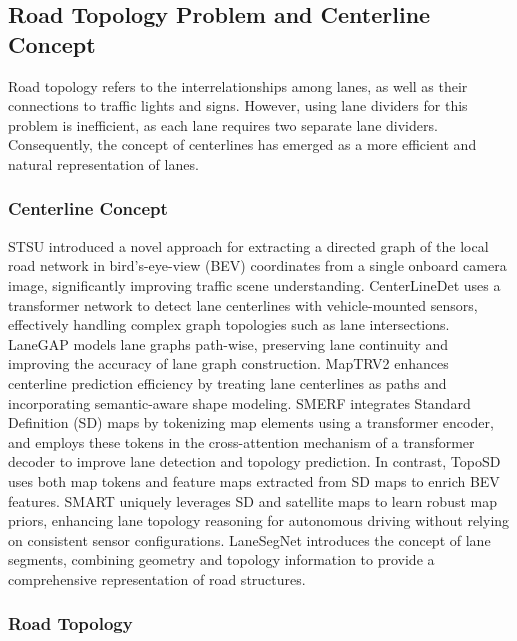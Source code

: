 \subsection{Road Topology Problem and Centerline Concept}

Road topology refers to the interrelationships among lanes, as well as their connections to traffic lights and signs. However, using lane dividers for this problem is inefficient, as each lane requires two separate lane dividers. Consequently, the concept of centerlines has emerged as a more efficient and natural representation of lanes.

\subsubsection{Centerline Concept}

STSU \cite{can2021structured} introduced a novel approach for extracting a directed graph of the local road network in bird’s-eye-view (BEV) coordinates from a single onboard camera image, significantly improving traffic scene understanding. CenterLineDet \cite{xu2022centerlinedet} uses a transformer network to detect lane centerlines with vehicle-mounted sensors, effectively handling complex graph topologies such as lane intersections. LaneGAP \cite{liao2023lane} models lane graphs path-wise, preserving lane continuity and improving the accuracy of lane graph construction. MapTRV2 \cite{liao2024maptrv2} enhances centerline prediction efficiency by treating lane centerlines as paths and incorporating semantic-aware shape modeling. SMERF \cite{luo2023augmenting} integrates Standard Definition (SD) maps by tokenizing map elements using a transformer encoder, and employs these tokens in the cross-attention mechanism of a transformer decoder to improve lane detection and topology prediction. In contrast, TopoSD \cite{yang2024toposd} uses both map tokens and feature maps extracted from SD maps to enrich BEV features. SMART \cite{ye2025smart} uniquely leverages SD and satellite maps to learn robust map priors, enhancing lane topology reasoning for autonomous driving without relying on consistent sensor configurations. LaneSegNet \cite{li2023lanesegnet} introduces the concept of lane segments, combining geometry and topology information to provide a comprehensive representation of road structures.

\subsubsection{Road Topology}

